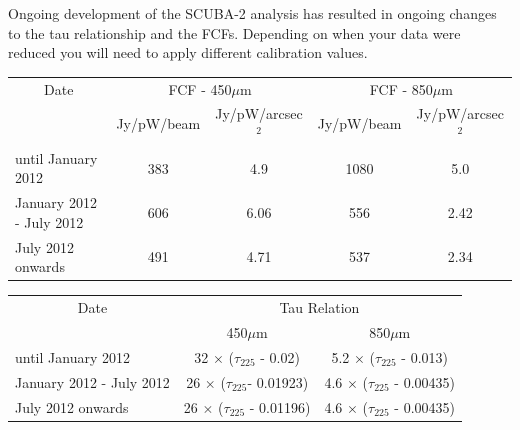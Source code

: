 \documentclass[twoside,11pt]{article}
\renewcommand{\_}{\texttt{\symbol{95}}}
\begin{document}
Ongoing development of the SCUBA-2 analysis has resulted in ongoing
changes to the tau relationship and the FCFs. Depending on when your
data were reduced you will need to apply different calibration values.
\\
\begin{table}[h!]
\begin{center}
\begin{tabular}{|l|c|c|c|c|}
 \hline
 \multicolumn{1}{|c|}{Date} &
 \multicolumn{2}{c|}{FCF - 450$\mu$m} &
 \multicolumn{2}{c|}{FCF - 850$\mu$m} \\
\cline{2-5}
& Jy/pW/beam &Jy/pW/arcsec$^2$ & Jy/pW/beam &Jy/pW/arcsec$^2$ \\
 \hline
until January 2012 &383  & 4.9&1080 &5.0 \\
January 2012 - July 2012&606&6.06 &556 &2.42 \\
July 2012 onwards&491 &4.71 &537 &2.34 \\
\hline
\end{tabular}
\end{center}
\end{table}
\vspace{-2mm}
\begin{table}[h!]
\begin{center}
\begin{tabular}{|l|c|c|}
 \hline
 \multicolumn{1}{|c}{Date} & \multicolumn{2}{|c|}{Tau Relation}  \\ \cline{2-3}
                           & 450$\mu$m  & 850$\mu$m \\ \hline
until January 2012       & 32 $\times$ ($\tau_{225}$ - 0.02)    & 5.2 $\times$ ($\tau_{225}$ - 0.013)  \\
January 2012 - July 2012 & 26 $\times$ ($\tau_{225}$- 0.01923)  & 4.6 $\times$ ($\tau_{225}$ - 0.00435)  \\
July 2012 onwards        & 26 $\times$ ($\tau_{225}$ - 0.01196) & 4.6 $\times$ ($\tau_{225}$ - 0.00435)  \\
\hline
\end{tabular}
\end{center}
\end{table}
\end{document}
